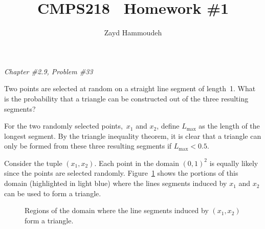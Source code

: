 \documentclass{report}
\title{\textbf{CMPS218 \textendash\ Homework \#1}}
\author{Zayd Hammoudeh}
\newcounter{subProbCount}       %
\newenvironment{problemshell}{
  \par%
  \medskip
  \leftskip=0pt\rightskip=0pt%
}
{
  \par\medskip
  \setcounter{subProbCount}{1} %
}
\newenvironment{problem}[3]
{%
  \begin{problemshell}
    \noindent \textit{Chapter \##1.#2, Problem \##3} \\
    \bfseries
}
{
  \end{problemshell}
}
\begin{document}
  \maketitle

  \begin{problem}{2}{9}{33}
    Two points are selected at random on a straight line segment of length~1.  What is the probability that a triangle can be constructed out of the three resulting segments?
  \end{problem}

  For the two randomly selected points,~$x_1$ and $x_2$, define $L_{\max}$ as the length of the longest segment.  By the triangle inequality theorem, it is clear that a triangle can only be formed from these three resulting segments if ${L_{\max} < 0.5}$.


  Consider the tuple ${(x_1,x_2)}$. Each point in the domain $(0,1)^2$ is equally likely since the points are selected randomly.  Figure~\ref{fig:problem2.9.33} shows the portions of this domain (highlighted in light blue) where the lines segments induced by $x_1$ and $x_2$ can be used to form a triangle.

  \begin{figure}[h]
    \centering
    \caption{Regions of the domain where the line segments induced by $(x_1,x_2)$ form a triangle.}\label{fig:problem2.9.33}
  \end{figure}
\end{document}
